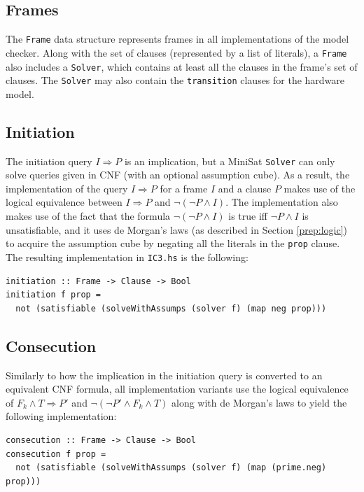 \documentclass[12pt,a4paper,twoside,openright]{report}
\begin{document}
{\subsection{Frames}
The \verb,Frame, data structure represents frames in all implementations of the model checker.
Along with the set of clauses (represented by a list of literals), a \verb,Frame, also includes
a \verb,Solver,, which contains at least all the clauses in the frame's set of clauses. The
\verb,Solver, may also contain the \verb,transition, clauses for the hardware model.

\subsection{Initiation}

The initiation query $I \Rightarrow P$ is an implication, but a MiniSat \verb,Solver, can only
solve queries given in CNF (with an optional assumption cube).
As a result, the implementation of the query $I \Rightarrow P$ for a frame $I$ and a
clause $P$ makes use of the logical equivalence between
$I \Rightarrow P$ and $\neg (\neg P \wedge I)$. The implementation
also makes use of the fact that the formula $\neg (\neg P \wedge I)$ is true
iff $\neg P \wedge I$ is unsatisfiable, and it uses de Morgan's laws (as described in
Section \ref{prep:logic}) to acquire the assumption cube by negating all the literals in
the \verb,prop, clause. The resulting implementation in \verb,IC3.hs, is the
following:

\begin{lstlisting}
initiation :: Frame -> Clause -> Bool
initiation f prop =
  not (satisfiable (solveWithAssumps (solver f) (map neg prop)))
\end{lstlisting}

\subsection{Consecution}

Similarly to how the implication in the initiation query is converted to an equivalent CNF
formula, all implementation variants use the logical equivalence of
$F_k \wedge T \Rightarrow P'$ and $\neg (\neg P' \wedge F_k \wedge T)$ along with de Morgan's
laws to yield the following implementation:
\begin{lstlisting}
consecution :: Frame -> Clause -> Bool
consecution f prop =
  not (satisfiable (solveWithAssumps (solver f) (map (prime.neg) prop)))
\end{lstlisting}

}
\end{document}
